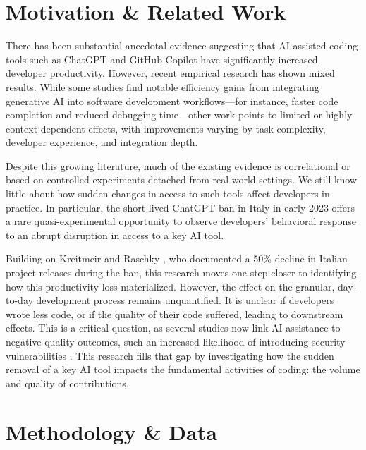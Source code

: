 \section*{Motivation \& Related Work}

There has been substantial anecdotal evidence suggesting that AI-assisted coding tools such as ChatGPT \cite{openai_chatgpt} and GitHub Copilot have significantly increased developer productivity. However, recent empirical research has shown mixed results\cite{cui2025the, paradis2024doesaiimpactdevelopment, peng2023impactaideveloperproductivity}. While some studies find notable efficiency gains from integrating generative AI into software development workflows—for instance, faster code completion and reduced debugging time—other work points to limited or highly context-dependent effects, with improvements varying by task complexity, developer experience, and integration depth.

Despite this growing literature, much of the existing evidence is correlational or based on controlled experiments detached from real-world settings. We still know little about how sudden changes in access to such tools affect developers in practice. In particular, the short-lived ChatGPT ban in Italy in early 2023 \cite{garante_ban_2023} offers a rare quasi-experimental opportunity to observe developers’ behavioral response to an abrupt disruption in access to a key AI tool.

Building on Kreitmeir and Raschky \cite{Kreitmeir2023}, who documented a 50\% decline in Italian project releases during the ban, this research moves one step closer to identifying how this productivity loss materialized. However, the effect on the granular, day-to-day development process remains unquantified. It is unclear if developers wrote less code, or if the quality of their code suffered, leading to downstream effects. This is a critical question, as several studies now link AI assistance to negative quality outcomes, such an increased likelihood of introducing security vulnerabilities \cite{fu2025securityweaknessescopilotgeneratedcode, pearce2021asleepkeyboardassessingsecurity}. This research fills that gap by investigating how the sudden removal of a key AI tool impacts the fundamental activities of coding: the volume and quality of contributions.


\section*{Methodology \& Data}

